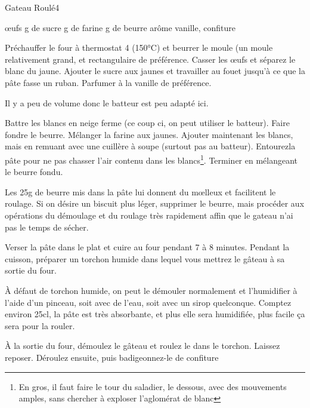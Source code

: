 \begin{recette}{Gateau Roulé}{4}{}{}
\begin{ingredients}
 œufs
 g de sucre
 g de farine
 g de beurre
\ingredient arôme vanille, confiture
\end{ingredients}

\begin{preparation}
\etape Préchauffer le four à thermostat 4 (150°C) et beurrer le moule (un moule relativement grand, et rectangulaire de préférence.
\etape Casser les œufs et séparez le blanc du jaune.
\etape Ajouter le sucre aux jaunes et travailler au fouet jusqu'à ce que la pâte fasse un ruban. Parfumer à la vanille de préférence.
\begin{remarque}
Il y a peu de volume donc le batteur est peu adapté ici.
\end{remarque}
\etape Battre les blancs en neige ferme (ce coup ci, on peut utiliser le batteur). Faire fondre le beurre.
\etape Mélanger la farine aux jaunes. Ajouter maintenant les blancs, mais en remuant avec une cuillère à soupe (surtout pas au batteur). \og Entourez\fg la pâte pour ne pas chasser l'air contenu dans les blancs\footnote{En gros, il faut faire le tour du saladier, le dessous, avec des mouvements amples, sans chercher à exploser l'aglomérat de blanc}.
\etape Terminer en mélangeant le beurre fondu.
\begin{remarque}
Les 25g de beurre mis dans la pâte lui donnent du mœlleux et facilitent le roulage. Si on désire un biscuit plus léger, supprimer le beurre, mais procéder aux opérations du démoulage et du roulage très rapidement affin que le gateau n'ai pas le temps de sécher.
\end{remarque}
\etape Verser la pâte dans le plat et cuire au four pendant 7 à 8 minutes.
\etape Pendant la cuisson, préparer un torchon humide dans lequel vous mettrez le gâteau à sa sortie du four.
\begin{remarque}
À défaut de torchon humide, on peut le démouler normalement et l'humidifier à l'aide d'un pinceau, soit avec de l'eau, soit avec un sirop quelconque. Comptez environ 25cl, la pâte est très absorbante, et plus elle sera humidifiée, plus facile ça sera pour la rouler.
\end{remarque}
\etape À la sortie du four, démoulez le gâteau et roulez le dans le torchon. Laissez reposer.
\etape Déroulez ensuite, puis badigeonnez-le de confiture
\end{preparation}


\end{recette}
